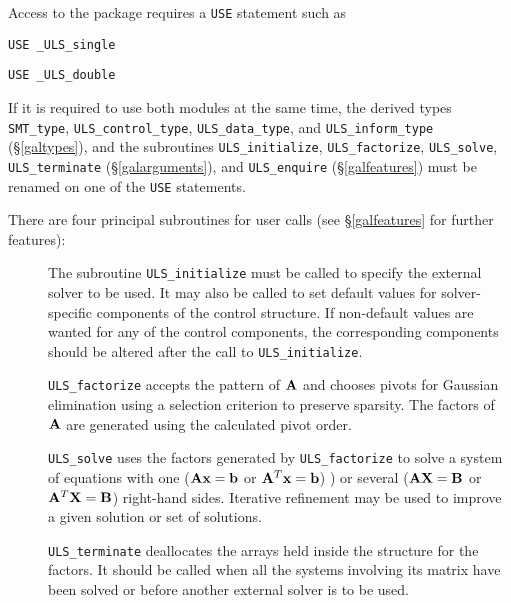 \documentclass{galahad}
\newcommand{\packagename}{ULS}
\newcommand{\fullpackagename}{\libraryname\_\-\packagename}
\begin{document}
Access to the package requires a {\tt USE} statement such as

\medskip{}

\hskip0.5in {\tt USE \fullpackagename\_single}

\medskip{}

\hskip0.5in {\tt USE  \fullpackagename\_double}

\medskip

If it is required to use both modules at the same time, the derived types 
{\tt SMT\_type},
{\tt \packagename\_control\_type},
{\tt \packagename\_data\-\_type}, and
{\tt \packagename\_inform\_type}
(\S\ref{galtypes}),
and the subroutines
{\tt \packagename\_initialize},
{\tt \packagename\_factorize},
{\tt \packagename\_solve},
{\tt \packagename\_terminate}
(\S\ref{galarguments}),
and
{\tt \packagename\_enquire}
(\S\ref{galfeatures})
must be renamed on one of the {\tt USE} statements.

\noindent There are four principal subroutines for user calls (see 
\S\ref{galfeatures} for further features): 

\begin{description} 
 
\item[] The subroutine {\tt \packagename\_initialize} must be called to 
specify the external solver to be used. 
It may also be called to set default values 
for solver-specific components of the control structure. 
If non-default values are 
wanted for any of the control components, the corresponding components 
should be altered after the call to {\tt \packagename\_initialize}. 
  
\item[] {\tt \packagename\_factorize} accepts the pattern of ${\mathbf{A}}$ 
 and chooses pivots for Gaussian elimination using a selection 
 criterion to preserve sparsity.  The factors of ${\mathbf{A}}$ are generated 
 using the calculated pivot order.
 
\item[] {\tt \packagename\_solve} uses the factors generated by 
  {\tt \packagename\_factorize} to 
  solve a system of equations with one (${\mathbf{A}} {\mathbf{x}} = {\mathbf{b}}$ or ${\mathbf{A}}^T {\mathbf{x}} = {\mathbf{b}}$) ) 
  or several (${\mathbf{A}} {\mathbf{X}} = {\mathbf{B}}$ or ${\mathbf{A}}^T {\mathbf{X}} = {\mathbf{B}}$) right-hand sides.
  Iterative refinement may be used to improve a given solution 
  or set of solutions.
 
\item[] {\tt \packagename\_terminate} deallocates the arrays held inside the  
  structure for the factors. It should be called 
  when all the systems involving its matrix have been solved 
  or before another external solver is to be used.
\end{description} 
\end{document}
